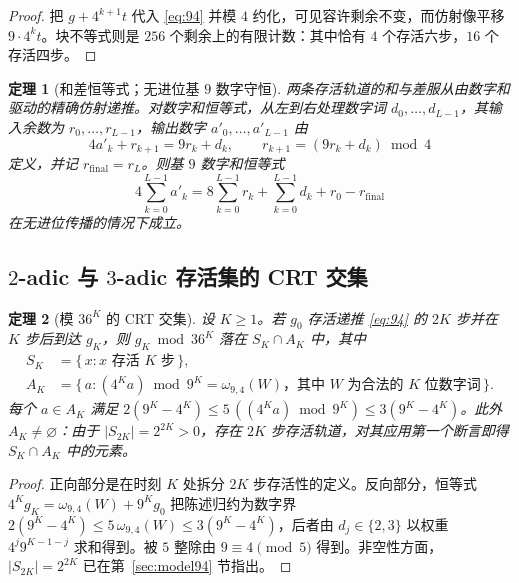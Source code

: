 \documentclass[11pt,a4paper]{article}
\newtheorem{theorem}{定理}[section]
\theoremstyle{remark}
\begin{document}
\begin{proof}
把 $g + 4^{k+1} t$ 代入 \eqref{eq:94} 并模 $4$ 约化，可见容许剩余不变，而仿射像平移 $9 \cdot 4^{k} t$。块不等式则是 $256$ 个剩余上的有限计数：其中恰有 $4$ 个存活六步，$16$ 个存活四步。
\end{proof}

\begin{theorem}[和差恒等式；无进位基 $9$ 数字守恒]
\label{thm:shadows}
两条存活轨道的和与差服从由数字和驱动的精确仿射递推。对数字和恒等式，从左到右处理数字词 $d_{0}, \dots, d_{L-1}$，其输入余数为 $r_{0}, \dots, r_{L-1}$，输出数字 $a'_{0}, \dots, a'_{L-1}$ 由
\[
  4a'_{k} + r_{k+1} = 9r_{k} + d_{k}, \qquad r_{k+1} = (9r_{k} + d_{k}) \bmod 4
\]
定义，并记 $r_{\mathrm{final}} = r_{L}$。则基 $9$ 数字和恒等式
\[
  4 \sum_{k=0}^{L-1} a'_{k}
  = 8 \sum_{k=0}^{L-1} r_{k} + \sum_{k=0}^{L-1} d_{k} + r_{0} - r_{\mathrm{final}}
\]
在无进位传播的情况下成立。
\end{theorem}

\subsection{\texorpdfstring{$2$}{2}-adic 与 \texorpdfstring{$3$}{3}-adic 存活集的 CRT 交集}

\begin{theorem}[模 $36^{K}$ 的 CRT 交集]
\label{thm:cantor}
设 $K \ge 1$。若 $g_{0}$ 存活递推 \eqref{eq:94} 的 $2K$ 步并在 $K$ 步后到达 $g_{K}$，则 $g_{K} \bmod 36^{K}$ 落在 $S_{K} \cap A_{K}$ 中，其中
\begin{align*}
  S_{K} &= \{\, x : x \text{ 存活 } K \text{ 步}\,\}, \\
  A_{K} &= \bigl\{\, a : (4^{K} a) \bmod 9^{K} = \omega_{9,4}(W) \text{，其中 } W \text{ 为合法的 } K \text{ 位数字词} \,\bigr\}.
\end{align*}
每个 $a \in A_{K}$ 满足 $2(9^{K} - 4^{K}) \le 5\,((4^{K} a) \bmod 9^{K}) \le 3(9^{K} - 4^{K})$。此外 $A_{K} \neq \varnothing$：由于 $|S_{2K}| = 2^{2K} > 0$，存在 $2K$ 步存活轨道，对其应用第一个断言即得 $S_{K} \cap A_{K}$ 中的元素。
\end{theorem}

\begin{proof}
正向部分是在时刻 $K$ 处拆分 $2K$ 步存活性的定义。反向部分，恒等式 $4^{K} g_{K} = \omega_{9,4}(W) + 9^{K} g_{0}$ 把陈述归约为数字界 $2(9^{K} - 4^{K}) \le 5\, \omega_{9,4}(W) \le 3(9^{K} - 4^{K})$，后者由 $d_{j} \in \{2,3\}$ 以权重 $4^{j} 9^{K-1-j}$ 求和得到。被 $5$ 整除由 $9 \equiv 4 \pmod 5$ 得到。非空性方面，$|S_{2K}| = 2^{2K}$ 已在第~\ref{sec:model94} 节指出。
\end{proof}
\end{document}
